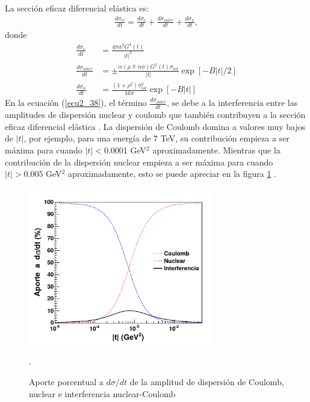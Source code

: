 \sp La secci\'on eficaz diferencial el\'astica es:
\begin{align}\label{ecu2_38}
\frac{d\sigma_{el}}{dt}=\frac{d\sigma_{c}}{dt}+\frac{d\sigma_{inter}}{dt}+\frac{d\sigma_n}{dt},
\end{align}
donde
\begin{align}\label{ecu2_39}
\nonumber \frac{d\sigma_{c}}{dt}&=\frac{4\pi\alpha^2 G^4(t)}{|t|^2}\\
\nonumber \frac{d\sigma_{inter}}{dt}&=\pm\frac{\alpha(\rho\mp\alpha\phi)G^2(t)\sigma_{tot}}{|t|}\exp[-B|t|/2]\\
\frac{d\sigma_n}{dt}&=\frac{(1+\rho^2)\sigma^2_{tot}}{16\pi}\exp[-B|t|]
\end{align}
En la ecuaci\'on (\ref{ecu2_38}), el t\'ermino  $\frac{d\sigma_{inter}}{dt}$, se debe a la interferencia entre las amplitudes de dispersi\'on nuclear y coulomb que tambi\'en contribuyen a la secci\'on eficaz diferencial el\'astica \cite{carlosavila}. La dispersi\'on de Coulomb domina a valores muy bajos de $|t|$, por ejemplo, para una energ\'ia de 7 TeV, su contribuci\'on empieza a ser m\'axima para cuando $|t|<$0.0001 GeV$^2$ aproximadamente. Mientras que la contribuci\'on de la dispersi\'on nuclear empieza a ser  m\'axima para cuando $|t|>0.005$ GeV$^2$ aproximadamente, esto se puede apreciar en la figura \ref{figurasavila} \cite{carlosavila}.
\begin{figure}[H]
\centering
\includegraphics[width=8cm]{Imagenes/figurastesis/151-794-1-SM.pdf}
\caption{Aporte porcentual a $d\sigma/dt$ de la amplitud de dispersi\'on de Coulomb, nuclear e interferencia nuclear-Coulomb}.
\label{figurasavila}
\end{figure}
